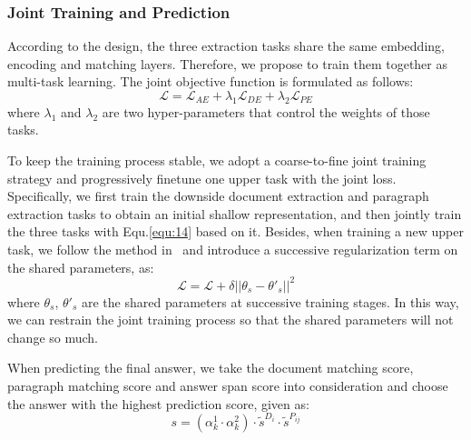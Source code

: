 \documentclass[letterpaper]{article} \usepackage{aaai19}  \usepackage{graphicx}
\begin{document}
\subsubsection{Joint Training and Prediction}
According to the design, the three extraction tasks share the same embedding, encoding and matching layers. Therefore, we propose to train them together as multi-task learning. The joint objective function is formulated as follows:
\begin{equation} \label{equ:14}
\mathcal{L}=\mathcal{L}_{AE}+\lambda_1\mathcal{L}_{DE}+\lambda_2\mathcal{L}_{PE}
\end{equation}
where $\lambda_1$ and $\lambda_2$ are two hyper-parameters that control the weights of those tasks.

To keep the training process stable, we adopt a coarse-to-fine joint training strategy and progressively finetune one upper task with the joint loss. Specifically, we first train the downside document extraction and paragraph extraction tasks to obtain an initial shallow representation, and then jointly train the three tasks with Equ.\ref{equ:14} based on it. Besides, when training a new upper task, we follow the method in~\cite{hashimoto2016joint} and introduce a successive regularization term on the shared parameters, as:
\begin{equation} \label{equ:15}
\mathcal{L}=\mathcal{L}+\delta ||\theta_s-{\theta}'_s||^{2}
\end{equation}
where $\theta_s$, ${\theta}'_s$ are the shared parameters at successive training stages. In this way, we can restrain the joint training process so that the shared parameters will not change so much. 

When predicting the final answer, we take the document matching score, paragraph matching score and answer span score into consideration and choose the answer with the highest prediction score, given as:
\begin{equation} \label{equ:16}
s=(\alpha_k^1\cdot \alpha_k^2)\cdot \tilde{s}^{D_i} \cdot \tilde{s}^{P_{ij}}
\end{equation}
\end{document}
